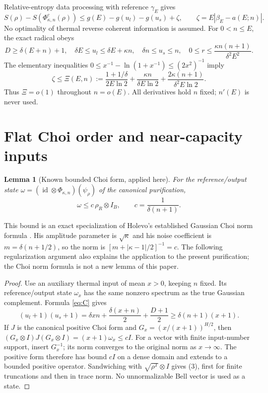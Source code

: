 \documentclass[11pt]{article}
\newtheorem{lemma}[theorem]{Lemma}
\newcommand{\id}{\operatorname{id}}
\newcommand{\PhiT}{\Phi_{\kappa,n}}
\begin{document}
Relative-entropy data processing with reference \(\gamma_E\) gives
\[
 S(\rho)-S(\PhiT^c(\rho))
 \le g(E)-g(u_l)-g(u_s)+\zeta,\qquad
 \zeta=E|\beta_E-a(E;n)|.
 \tag{1}
\]
No optimality of thermal reverse coherent information is assumed.
For \(0<n\le E\), the exact radical obeys
\[
 D\ge\delta(E+n)+1,\quad
 \delta E\le u_l\le\delta E+\kappa n,\quad
 \delta n\le u_s\le n,\quad
 0\le r\le\frac{\kappa n(n+1)}{\delta^2E^2}.
\]
The elementary inequalities
\(0\le x^{-1}-\ln(1+x^{-1})\le(2x^2)^{-1}\) imply
\[
 \zeta\le\Xi(E,n):=
 \frac{1+1/\delta}{2E\ln2}
 +\frac{\kappa n}{\delta E\ln2}
 +\frac{2\kappa(n+1)}{\delta^2E\ln2}.
 \tag{2}
\]
Thus \(\Xi=o(1)\) throughout \(n=o(E)\).
All derivatives hold \(n\) fixed; \(n'(E)\) is never used.

\section{Flat Choi order and near-capacity inputs}
\begin{lemma}[Known bounded Choi form, applied here]\label{lem:flat}
For the reference/output state
\(\omega=(\id\otimes\PhiT)(\psi_\rho)\) of the canonical purification,
\[
 \omega\le c\,\rho_R\otimes I_B,\qquad
 c=\frac1{\delta(n+1)}.                                      \tag{3}
\]
\end{lemma}
This bound is an exact specialization of Holevo's established Gaussian
Choi norm formula \cite[Proposition~2 and the one-mode example, p.~13]{choi}.
His amplitude parameter is \(\sqrt\kappa\) and his noise coefficient is
\(m=\delta(n+1/2)\), so the norm is
\([m+|\kappa-1|/2]^{-1}=c\). The following regularization argument
also explains the application to the present purification; the Choi
norm formula is not a new lemma of this paper.
\begin{proof}
Use an auxiliary thermal input of mean \(x>0\), keeping \(n\) fixed.
Its reference/output state \(\omega_x\) has the same nonzero spectrum as
the true Gaussian complement. Formula \eqref{eq:C} gives
\[
 (u_l+1)(u_s+1)
 =\delta xn+\frac{\delta(x+n)}2+\frac{D+1}2
 \ge\delta(n+1)(x+1).
\]
If \(J\) is the canonical positive Choi form and
\(G_x=(x/(x+1))^{H/2}\), then
\((G_x\otimes I)J(G_x\otimes I)=(x+1)\omega_x\le cI\).
For a vector with finite input-number support, insert \(G_x^{-1}\);
its norm converges to the original norm as \(x\to\infty\).
The positive form therefore has bound \(cI\) on a dense domain and
extends to a bounded positive operator. Sandwiching with
\(\sqrt{\rho^T}\otimes I\) gives (3), first for finite truncations and
then in trace norm. No unnormalizable Bell vector is used as a state.
\end{proof}
\end{document}
